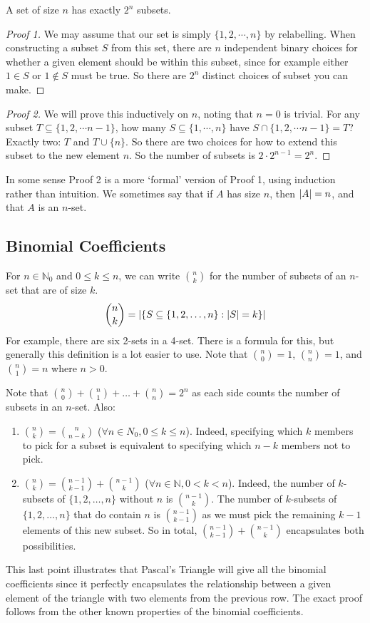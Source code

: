 \begin{proposition}
	A set of size $n$ has exactly $2^n$ subsets.
\end{proposition}
\begin{proof}[Proof 1]
	We may assume that our set is simply $\{ 1, 2, \cdots, n \}$ by relabelling. When constructing a subset $S$ from this set, there are $n$ independent binary choices for whether a given element should be within this subset, since for example either $1 \in S$ or $1 \notin S$ must be true. So there are $2^n$ distinct choices of subset you can make.
\end{proof}
\begin{proof}[Proof 2]
	We will prove this inductively on $n$, noting that $n=0$ is trivial. For any subset $T \subseteq \{ 1, 2, \cdots n-1 \}$, how many $S \subseteq \{ 1, \cdots, n \}$ have $S \cap \{ 1, 2, \cdots n-1 \} = T$? Exactly two: $T$ and $T \cup \{ n \}$. So there are two choices for how to extend this subset to the new element $n$. So the number of subsets is $2 \cdot 2^{n-1} = 2^n$.
\end{proof}
\noindent In some sense Proof 2 is a more `formal' version of Proof 1, using induction rather than intuition. We sometimes say that if $A$ has size $n$, then $\abs{A} = n$, and that $A$ is an $n$-set.

\subsection{Binomial Coefficients}
For $n \in \mathbb N_0$ and $0 \leq k \leq n$, we can write $\binom{n}{k}$ for the number of subsets of an $n$-set that are of size $k$.
\[ \binom{n}{k} = \abs{\left\{ S \subseteq \{ 1, 2, \dots, n \}: \abs{S} = k \right\}} \]
For example, there are six 2-sets in a 4-set. There is a formula for this, but generally this definition is a lot easier to use. Note that $\binom{n}{0} = 1$, $\binom{n}{n} = 1$, and $\binom{n}{1}=n$ where $n>0$.

Note that $\binom{n}{0} + \binom{n}{1} + \dots + \binom{n}{n} = 2^n$ as each side counts the number of subsets in an $n$-set. Also:
\begin{enumerate}
	\item $\binom{n}{k} = \binom{n}{n-k}$ ($\forall n \in N_0, 0 \leq k \leq n$). Indeed, specifying which $k$ members to pick for a subset is equivalent to specifying which $n-k$ members not to pick.
	\item $\binom{n}{k} = \binom{n-1}{k-1} + \binom{n-1}{k}$ ($\forall n \in \mathbb N, 0 < k < n$). Indeed, the number of $k$-subsets of $\{ 1, 2, \dots, n \}$ without $n$ is $\binom{n-1}{k}$. The number of $k$-subsets of $\{ 1, 2, \dots, n \}$ that do contain $n$ is $\binom{n-1}{k-1}$ as we must pick the remaining $k-1$ elements of this new subset. So in total, $\binom{n-1}{k-1} + \binom{n-1}{k}$ encapsulates both possibilities.
\end{enumerate}
This last point illustrates that Pascal's Triangle will give all the binomial coefficients since it perfectly encapsulates the relationship between a given element of the triangle with two elements from the previous row. The exact proof follows from the other known properties of the binomial coefficients.
